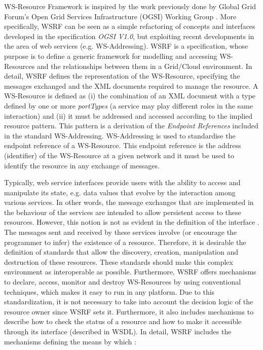WS-Resource Framework is inspired by the work previously done by Global Grid Forum's 
Open Grid Services Infrastructure (OGSI) Working Group \cite{Foster03}. More specifically,
WSRF can be seen as a simple refactoring of concepts and interfaces 
developed in the specification \emph{OGSI V1.0}, but
exploiting recent developments in the area of web services (e.g. WS-Addressing). 
WSRF is a specification, whose purpose is to define a 
generic framework for modelling and accessing WS-Resources and the relationships 
between them in a Grid/Cloud environment. In detail, WSRF defines 
the representation of the WS-Resource, specifying the messages exchanged and 
the XML documents required to manage the resource. 
A WS-Resource is defined as (i) the combination of an XML document with a type defined
by one or more \emph{portTypes} (a service may play different roles in the same interaction) and (ii) it must 
be addressed and accessed according to the implied resource pattern. This pattern is a derivation 
of the \emph{Endpoint References} included in the standard WS-Addressing. 
WS-Addressing is used to standardise the endpoint reference  of a WS-Resource. This endpoint
reference is the address (identifier) of the WS-Resource at
a given network and it must be used to identify the resource in any exchange of messages. 

Typically, web service interfaces provide users with the ability to access and manipulate its state, e.g. data values
that evolve by the interaction among various services. In other words, 
the message exchanges that are implemented in the behaviour of the services 
are intended to allow persistent access to these resources. However, this notion is not 
as evident in the definition of the interface \cite{Fost04}. The messages sent and received 
by these services involve (or encourage the programmer to infer) the existence of a resource. 
Therefore, it is desirable the definition of standards that allow the discovery, 
creation, manipulation and destruction of these resources. These standards should make this 
complex environment as interoperable as possible. Furthermore, 
WSRF offers mechanisms to declare, access, monitor and destroy WS-Resources by using conventional techniques, 
which makes it easy to run in any platform. Due to this standardization, 
it is not necessary to take into account the decision logic of the resource owner since WSRF sets it.
Furthermore, it also includes mechanisms to describe how to check the status of a resource 
and how to make it accessible through its interface (described in WSDL). 
In detail, WSRF includes the mechanisms defining the means by which \cite{WSRFstandard}:

